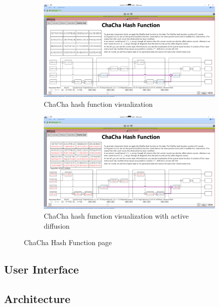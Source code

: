 \begin{figure}
\centering
\begin{subfigure}{\textwidth}
  \centering
  \includegraphics[width=\textwidth]{figures/chachahash}
  \caption{ChaCha hash function visualization}
  \label{chachahash.inactive}
\end{subfigure}

\begin{subfigure}{\textwidth}
  \centering
  \includegraphics[width=\textwidth]{figures/chachahash-diffusion}
  \caption{ChaCha hash function visualization with active diffusion}
  \label{chachahash.active}
\end{subfigure}
\caption{ChaCha Hash Function page}
\label{chachahash}
\end{figure}

\subsection{User Interface}
\label{sec:userInterface}

\subsection{Architecture}
\label{sec:Architecture}

